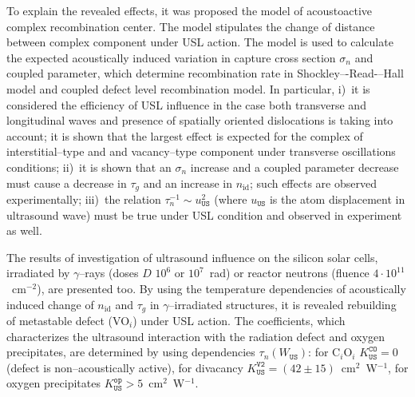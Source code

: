 To explain the revealed effects, it was proposed the model of acoustoactive complex recombination center.
The model stipulates the change of distance between complex component under USL action.
The model is used to calculate the expected acoustically induced variation in capture cross section $\sigma_{n}$ and coupled parameter, which determine recombination rate in Shockley–-Read-–Hall model and coupled defect level recombination model.
In particular,
i)~it is considered the efficiency of USL influence in the case both transverse and longitudinal waves and presence of spatially oriented dislocations is taking into account;
it is shown that the largest effect is expected for the complex of interstitial--type and and vacancy--type component under transverse oscillations conditions;
ii)~it is shown that an $\sigma_{n}$ increase and a coupled parameter decrease must cause a decrease in $\tau_g$ and an increase in $n_\mathrm{id}$; such effects are observed experimentally;
iii)~the relation $\tau_{n}^{-1}\sim u_{\mathtt{US}}^2$
(where $u_\mathtt{US}$ is the atom displacement in ultrasound wave)
must be true under USL condition and observed in experiment as well.




The results of investigation of ultrasound influence on the silicon solar cells,
irradiated by $\gamma$--rays (doses $D$ $10^6$ or $10^7$~rad) or reactor neutrons (fluence $4\cdot10^{11}$~cm$^{-2}$),
are presented too.
By using the temperature dependencies of acoustically induced change of $n_\mathrm{id}$ and $\tau_{g}$ in $\gamma$--irradiated structures, it is revealed rebuilding of metastable defect (VO$_i$) under USL action.
The coefficients, which characterizes the ultrasound interaction with the radiation defect and oxygen precipitates,  are determined by using dependencies $\tau_n(W_\mathtt{US})$:
for C$_i$O$_i$ $K_\mathtt{US}^\mathtt{CO}=0$ (defect is non--acoustically active),
for divacancy $K_\mathtt{US}^\mathtt{V2}=(42\pm15)$~cm$^2$~W$^{-1}$,
for oxygen precipitates $K_\mathtt{US}^\mathtt{op}>5$~cm$^2$~W$^{-1}$.


